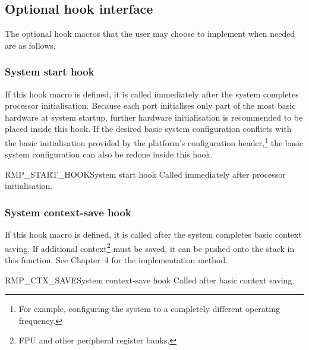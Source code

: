 \subsection{Optional hook interface}

The optional hook macros that the user may choose to implement when needed are as follows.

\subsubsection{System start hook}

If this hook macro is defined, it is called immediately after the system completes processor initialisation.
Because each port initialises only part of the most basic hardware at system startup, further hardware initialisation is recommended to be placed inside this hook.
If the desired basic system configuration conflicts with the basic initialisation provided by the platform's configuration header,\footnote{For example, configuring the system to a completely different operating frequency.} the basic system configuration can also be redone inside this hook.

\begin{apidesc}{RMP\_START\_HOOK}{System start hook}\label{api:RMP_START_HOOK}
    Called immediately after processor initialisation.
    \begin{apiparams}
    \end{apiparams}
    \begin{apiret}
    \end{apiret}
\end{apidesc}

\subsubsection{System context-save hook}

If this hook macro is defined, it is called after the system completes basic context saving.
If additional context\footnote{FPU and other peripheral register banks.} must be saved, it can be pushed onto the stack in this function.
See Chapter~4 for the implementation method.

\begin{apidesc}{RMP\_CTX\_SAVE}{System context-save hook}\label{api:RMP_CTX_SAVE}
    Called after basic context saving.
    \begin{apiparams}
    \end{apiparams}
    \begin{apiret}
    \end{apiret}
\end{apidesc}

